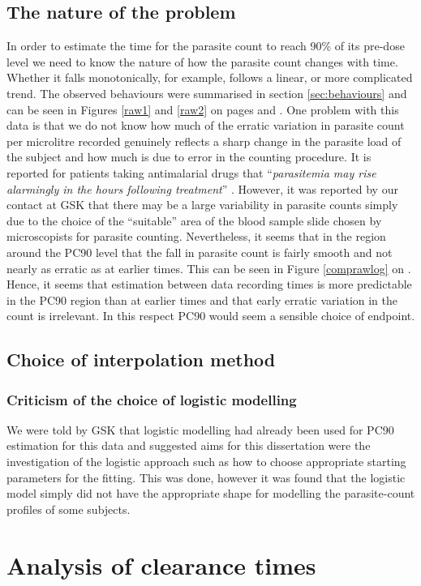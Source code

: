 \subsection{The nature of the problem}
In order to estimate the time for the parasite count to reach 90\% of its pre-dose level we need to know the nature of how the parasite count changes with time. Whether it falls monotonically, for example, follows a linear, or more complicated trend. The observed behaviours were summarised in section \ref{sec:behaviours} and can be seen in Figures \ref{raw1} and \ref{raw2} on pages \pageref{raw1} and \pageref{raw2}. One problem with this data is that we do not know how much of the erratic variation in parasite count per microlitre recorded genuinely reflects a sharp change in the parasite load of the subject and how much is due to error in the counting procedure. It is reported for patients taking antimalarial drugs that ``\textit{parasitemia may rise alarmingly in the hours following treatment}'' \cite{white}. However, it was reported by our contact at GSK that there may be a large variability in parasite counts simply due to the choice of the ``suitable'' area of the blood sample slide chosen by microscopists for parasite counting. Nevertheless, it seems that in the region around the PC90 level that the fall in parasite count is fairly smooth and not nearly as erratic as at earlier times. This can be seen in Figure \ref{comprawlog} on \pageref{comprawlog}. Hence, it seems that estimation between data recording times is more predictable in the PC90 region than at earlier times and that early erratic variation in the count is irrelevant. In this respect PC90 would seem a sensible choice of endpoint.
\subsection{Choice of interpolation method}
\subsubsection*{Criticism of the choice of logistic modelling}
We were told by GSK that logistic modelling had already been used for PC90 estimation for this data and suggested aims for this dissertation were the investigation of the logistic approach such as how to choose appropriate starting parameters for the fitting. This was done, however it was found that the logistic model simply did not have the appropriate shape for modelling the parasite-count profiles of some subjects. 

\section{Analysis of clearance times}